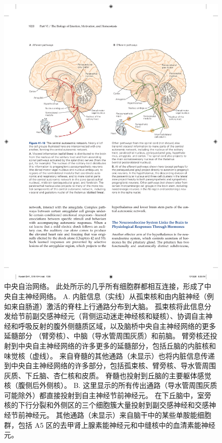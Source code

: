 \begin{figure}[htbp]
	\centering
	\includegraphics[width=0.95\linewidth]{chap41/fig_41_10}
	\caption{中央自治网络。 此处所示的几乎所有细胞群都相互连接，形成了中央自主神经网络。 A. 内脏信息（实线）从孤束核和由内脏神经（例如来自肠道）激活的脊柱上行通路分布到大脑。 孤束核将此信息分发给节前副交感神经元（背侧运动迷走神经核和疑核）、协调自主神经和呼吸反射的腹外侧髓质区域，以及脑桥中央自主神经网络的更多延髓部分 （臂旁核）、中脑（导水管周围灰质）和前脑。 臂旁核还投射到中央自主神经网络的许多更多的延髓部分，包括丘脑的内脏核和味觉核（虚线）。 来自脊髓的其他通路（未显示）也将内脏信息传递到中央自主神经网络的许多部分，包括孤束核、臂旁核、导水管周围灰质、下丘脑、杏仁核和皮质。 脊髓也投射到丘脑的主要躯体感觉核（腹侧后外侧核）。 B. 这里显示的所有传出通路（导水管周围灰质可能除外）都直接投射到自主神经节前神经元。 在下丘脑中，室旁核的下行分裂和外侧区的三个细胞簇大量投射到副交感神经和交感神经节前神经元。 其他通路（未显示）来自脑干中的某些单胺能细胞群，包括 A5 区的去甲肾上腺素能神经元和中缝核中的血清素能神经元。}
	\label{fig:41_10}
\end{figure}

